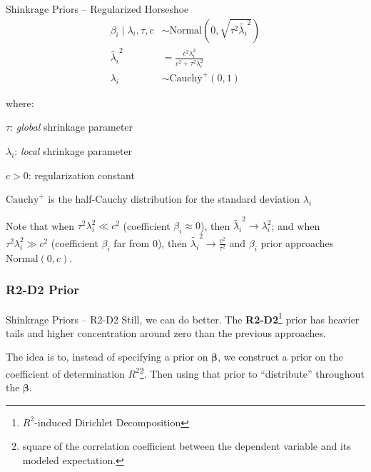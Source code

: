 \begin{frame}{Shinkrage Priors -- Regularized Horseshoe}
    $$
        \begin{aligned}
            \beta_i \mid \lambda_i, \tau, c &\sim \text{Normal} \left( 0, \sqrt{\tau^2 \tilde{\lambda_i}^2} \right) \\
            \tilde{\lambda_i}^2 &= \frac{c^2 \lambda_i^2}{c^2 + \tau^2 \lambda_i^2} \\
            \lambda_i &\sim \text{Cauchy}^+ (0, 1)
        \end{aligned}
    $$

    where:
    \begin{vfilleditems}
        \small
        \item $\tau$: \textit{global} shrinkage parameter
        \item $\lambda_i$: \textit{local} shrinkage parameter
        \item $c > 0$: regularization constant
        \item $\text{Cauchy}^+$ is the half-Cauchy distribution for the
            standard deviation $\lambda_i$
    \end{vfilleditems}
    \small
    Note that when $\tau^2 \lambda_i^2 \ll c^2$ (coefficient $\beta_i \approx 0$),
    then $\tilde{\lambda_i}^2 \to \lambda_i^2$;
    and when $\tau^2 \lambda_i^2 \gg c^2$ (coefficient $\beta_i$ far from $0$),
    then $\tilde{\lambda_i}^2 \to \frac{c^2}{\tau^2}$ and $\beta_i$ prior
    approaches $\text{Normal}(0,c)$.
\end{frame}

\subsubsection{R2-D2 Prior}
\begin{frame}{Shinkrage Priors -- R2-D2}
    Still, we can do better.
    The \textbf{R2-D2}\footnote{
        $R^2$-induced Dirichlet Decomposition
    } prior \parencite{zhang2022bayesian} has heavier tails and
    higher concentration around zero than the previous approaches.

    The idea is to, instead of specifying a prior on $\boldsymbol{\beta}$,
    we construct a prior on the coefficient of determination $R^2$\footnote{
        square of the correlation coefficient between the dependent variable
        and its modeled expectation.}.
    Then using that prior to ``distribute'' throughout the $\boldsymbol{\beta}$. 
\end{frame}

